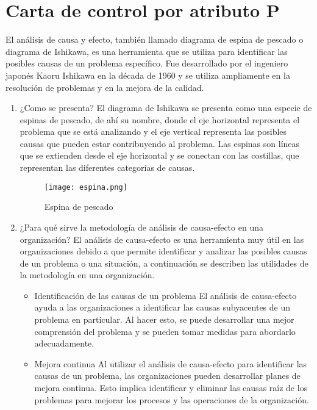 \documentclass{article}
\theoremstyle{mytheoremstyle}
\theoremstyle{mytheoremstyle}
\theoremstyle{myproblemstyle}
\begin{document}
\section{Carta de control por atributo P}
El análisis de causa y efecto, también
llamado diagrama de espina de
pescado o diagrama de Ishikawa, es
una herramienta que se utiliza para
identificar las posibles causas de un
problema específico. Fue
desarrollado por el ingeniero japonés
Kaoru Ishikawa en la década de 1960
y se utiliza ampliamente en la
resolución de problemas y en la
mejora de la calidad.
\begin{enumerate}
	\item ¿Como se presenta?\newline
	El diagrama de Ishikawa se presenta
	como una especie de espinas de
	pescado, de ahí su nombre, donde el
	eje horizontal representa el problema
	que se está analizando y el eje vertical
	representa las posibles causas que
	pueden estar contribuyendo al
	problema. Las espinas son líneas que
	se extienden desde el eje horizontal y
	se conectan con las costillas, que
	representan las diferentes categorías
	de causas.   
		            \begin{figure}[H]
			            \centering
			            \texttt{[image: espina.png]}
			            \caption{Espina de pescado}
			            \label{fig:imagen2}
		            \end{figure}
	\item ¿Para qué sirve la
	metodología de análisis
	de causa-efecto en una
	organización?\newline
	El análisis de causa-efecto es una
	herramienta muy útil en las
	organizaciones debido a que permite
	identificar y analizar las posibles
	causas de un problema o una situación,
	a continuación se describen las
	utilidades de la metodología en una
	organización.
	      \begin{itemize}
			\newpage
		      \item Identiﬁcación de las causas de un problema\newline
		      El análisis de causa-efecto ayuda a las organizaciones a identiﬁcar las causas subyacentes de un problema en particular. Al hacer esto, se puede desarrollar una mejor comprensión del problema y se pueden tomar medidas para abordarlo adecuadamente.
				\item Mejora continua\newline
				Al utilizar el análisis de causa-efecto para identiﬁcar las causas de un problema, las organizaciones pueden desarrollar planes de mejora continua. Esto implica identiﬁcar y eliminar las causas raíz de los problemas para mejorar los procesos y las operaciones de la organización.

\end{itemize}
\end{enumerate}
\end{document}

